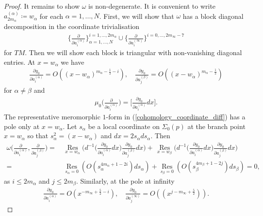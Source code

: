 \documentclass[10pt,a4paper]{amsart}
\begin{document}
 \begin{proof} 
 It remains to show $\omega$ is non-degenerate.  It is convenient to write $a_{2m_\alpha}^{(\alpha)} \coloneqq w_\alpha$ for each $\alpha = 1,...,N$.  First,  we will show that $\omega$ has a block diagonal decomposition in the coordinate trivialisation
\begin{align}
\bigg\{ \frac{\partial}{\partial a_{i}^{(\alpha)}} \bigg\}_{\alpha = 1,...,N}^{i = 1,...,2m_\alpha} \cup \bigg\{ \frac{\partial}{\partial a_{i}^{(\infty)}} \bigg\}^{i = 0,...,2m_\infty - 7}
\end{align}
for $TM$.  
Then we will show each block is triangular with non-vanishing diagonal entries.  
 At $x = w_\alpha$ we have
\begin{align}\label{order_diff_1}
\frac{\partial y_0}{\partial a_i^{(\alpha)}} = O((x-w_\alpha)^{m_\alpha - \frac{1}{2} - i}),  \quad 
\frac{\partial y_0}{\partial a_j^{(\beta)}} = O((x-w_\alpha)^{m_\alpha - \frac{1}{2}}) 
\end{align}
for $\alpha \ne \beta$ and 
\begin{align}\label{cohomology_coordinate_diff}
\mu_0\bigg(\frac{\partial}{\partial a_i^{(\alpha)}}  \bigg) = \Bigg[ \frac{\partial y_0}{\partial a_i^{(\alpha)}} dx \Bigg] .  
\end{align}
The representative meromorphic $1$-form in (\ref{cohomology_coordinate_diff}) has a pole only at $x = w_\alpha$.  Let $s_\alpha$ be a local coordinate on $\Sigma_0(p)$ at the branch point $x = w_\alpha$ so that $s_\alpha^2 = (x-w_\alpha)$ and $dx = 2s_\alpha ds_\alpha$.  Then 
\begin{align}
\omega \bigg(\frac{\partial }{\partial a_i^{(\alpha)}},  \frac{\partial }{\partial a_j^{(\beta)}} \bigg) = \,  &\underset{x = w_\alpha}{\operatorname{Res}} \bigg( d^{-1} \bigg( \frac{\partial y_0}{\partial a_i^{(\alpha)}}  dx \bigg) \frac{\partial y_0}{\partial a_j^{(\beta)}} dx \bigg) \nonumber +  \,  \underset{x = w_\beta}{\operatorname{Res}} \bigg( d^{-1} \bigg( \frac{\partial y_0}{\partial a_i^{(\alpha)}}  dx \bigg)  \frac{\partial y_0}{\partial a_j^{(\beta)}} dx \bigg) \nonumber \\
= \,  & \underset{s_\alpha = 0}{\operatorname{Res}}(O(s_\alpha^{4m_\alpha+1-2i}) ds_\alpha) +  \underset{s_\beta = 0}{\operatorname{Res}}(O(s_\beta^{4m_\beta+1-2j}) ds_\beta) = 0, 
\end{align}
as $i \le 2m_\alpha$ and  $j \le 2m_\beta$.  Similarly,  at the pole at infinity
\begin{align}\label{order_diff_inf_1}
\frac{\partial y_0}{\partial a_i^{(\alpha)}} = O(x^{-m_\infty+\frac{5}{2}-i}),  \quad \frac{\partial y_0}{\partial a_j^{(\infty)}} = O((x^{j-m_\infty+\frac{5}{2}})).

\end{align}
\end{proof}
\end{document}
